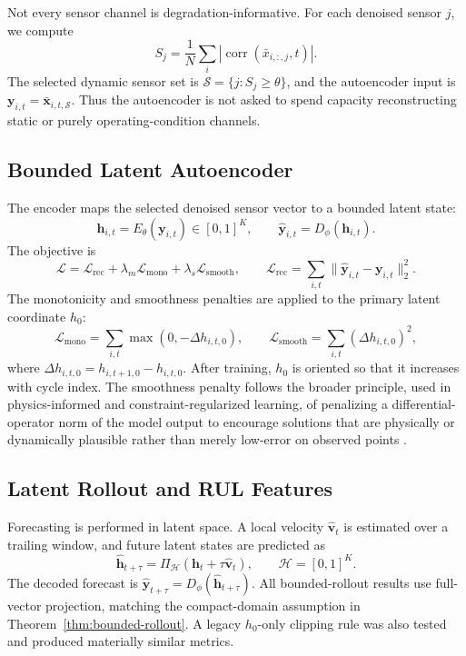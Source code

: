 \documentclass[a4paper,fleqn]{cas-sc}
\newcommand{\x}{\mathbf{x}}
\newcommand{\h}{\mathbf{h}}
\newcommand{\y}{\mathbf{y}}
\newcommand{\Hspace}{\mathcal{H}}
\newcommand{\Sset}{\mathcal{S}}
\newcommand{\Lrec}{\mathcal{L}_{\mathrm{rec}}}
\newcommand{\Lmono}{\mathcal{L}_{\mathrm{mono}}}
\newcommand{\Lsmooth}{\mathcal{L}_{\mathrm{smooth}}}
\begin{document}
Not every sensor channel is degradation-informative. For each denoised sensor
$j$, we compute
\[
    S_j
    =
    \frac{1}{N}
    \sum_i
    \left|
    \operatorname{corr}(\bar{x}_{i,:,j},t)
    \right|.
\]
The selected dynamic sensor set is $\Sset=\{j:S_j\geq\theta\}$, and the
autoencoder input is $\y_{i,t}=\bar{\x}_{i,t,\Sset}$. Thus the autoencoder is
not asked to spend capacity reconstructing static or purely
operating-condition channels.

\subsection{Bounded Latent Autoencoder}

The encoder maps the selected denoised sensor vector to a bounded latent state:
\[
    \h_{i,t}=E_\theta(\y_{i,t})\in[0,1]^K,
    \qquad
    \hat{\y}_{i,t}=D_\phi(\h_{i,t}).
\]
The objective is
\[
    \mathcal{L}
    =
    \Lrec+\lambda_m\Lmono+\lambda_s\Lsmooth,
    \qquad
    \Lrec=\sum_{i,t}\|\hat{\y}_{i,t}-\y_{i,t}\|_2^2.
\]
The monotonicity and smoothness penalties are applied to the primary latent
coordinate $h_0$:
\[
    \Lmono
    =
    \sum_{i,t}
    \max(0,-\Delta h_{i,t,0}),
    \qquad
    \Lsmooth
    =
    \sum_{i,t}
    (\Delta h_{i,t,0})^2,
\]
where $\Delta h_{i,t,0}=h_{i,t+1,0}-h_{i,t,0}$. After training, $h_0$ is
oriented so that it increases with cycle index. The smoothness penalty follows
the broader principle, used in physics-informed and constraint-regularized
learning, of penalizing a differential-operator norm of the model output to
encourage solutions that are physically or dynamically plausible rather than
merely low-error on observed points \citep{raissi2019physics}.

\subsection{Latent Rollout and RUL Features}

Forecasting is performed in latent space. A local velocity
$\hat{\mathbf{v}}_t$ is estimated over a trailing window, and future latent
states are predicted as
\[
    \hat{\h}_{t+\tau}
    =
    \Pi_{\Hspace}
    \left(
    \h_t+\tau\hat{\mathbf{v}}_t
    \right),
    \qquad
    \Hspace=[0,1]^K .
\]
The decoded forecast is $\hat{\y}_{t+\tau}=D_\phi(\hat{\h}_{t+\tau})$.
All bounded-rollout results use full-vector projection, matching the
compact-domain assumption in Theorem~\ref{thm:bounded-rollout}. A legacy
$h_0$-only clipping rule was also tested and produced materially similar
metrics.
\end{document}
